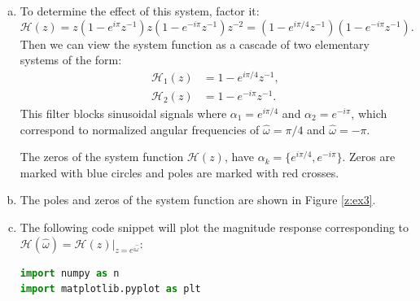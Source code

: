 \begin{enumerate}
\begin{enumerate}[a)]
\item To determine the effect of this system, factor it:
$$\mathcal{H}(z)=z(1-e^{i\pi}z^{-1})z(1-e^{-i\pi}z^{-1})z^{-2}=(1-e^{i\pi/4}z^{-1})(1-e^{-i\pi}z^{-1}).$$
Then we can view the system function as a cascade of two elementary systems of the form:
\begin{align*}
    \mathcal{H}_{1}(z)&=1-e^{i\pi/4}z^{-1},\\
    \mathcal{H}_{2}(z)&=1-e^{-i\pi}z^{-1}.
\end{align*}
This filter blocks sinusoidal signals where $\alpha_{1}=e^{i\pi/4}$ and $\alpha_{2}=e^{-i\pi}$, which correspond to normalized angular frequencies of $\hat{\omega}=\pi/4$ and $\hat{\omega}=-\pi$.

\begin{marginfigure}[-5cm]
\begin{center}
\end{center}
\caption{The zeros of the system function $\mathcal{H}(z)$,
have $\alpha_k=\{e^{i\pi/4},e^{-i\pi}\}$. Zeros are marked with blue
    circles and poles are marked with red crosses.}
\label{z:ex3}
\end{marginfigure}

\item The poles and zeros of the system function are shown in Figure \ref{z:ex3}. 

\item The following code snippet will plot the magnitude response corresponding to $\mathcal{H}(\hat{\omega})=\mathcal{H}(z)|_{z=e^{i\hat{\omega}}}$:
\begin{lstlisting}[language=Python,caption=Script to plot the magnitude response,label=sol_to_c]
import numpy as n
import matplotlib.pyplot as plt


\end{lstlisting}
\end{enumerate}
\end{enumerate}
